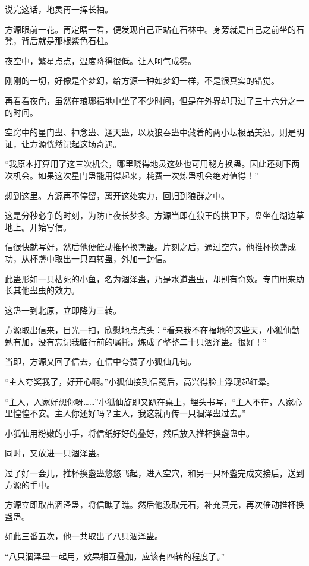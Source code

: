 \begin{this_body}
说完这话，地灵再一挥长袖。

方源眼前一花。再定睛一看，便发现自己正站在石林中。身旁就是自己之前坐的石凳，背后就是那根紫色石柱。

夜空中，繁星点点，温度降得很低。让人呵气成雾。

刚刚的一切，好像是个梦幻，给方源一种如梦幻一样，不是很真实的错觉。

再看看夜色，虽然在琅琊福地中坐了不少时间，但是在外界却只过了三十六分之一的时间。

空窍中的星门蛊、神念蛊、通天蛊，以及狼吞蛊中藏着的两小坛极品美酒。则是明证，让方源恍然记起这场奇遇。

“我原本打算用了这三次机会，哪里晓得地灵这处也可用秘方换蛊。因此还剩下两次机会。如果这次星门蛊能用得起来，耗费一次炼蛊机会绝对值得！”

想到这里。方源再不停留，离开这处实力，回归到狼群之中。

这是分秒必争的时刻，为防止夜长梦多。方源当即在狼王的拱卫下，盘坐在湖边草地上。开始写信。

信很快就写好，然后他便催动推杯换盏蛊。片刻之后，通过空穴，他推杯换盏成功，从杯盏中取出一只四转蛊，外加一封信。

此蛊形如一只枯死的小鱼，名为涸泽蛊，乃是水道蛊虫，却别有奇效。专门用来助长其他蛊虫的效力。

这蛊一到北原，立即降为三转。

方源取出信来，目光一扫，欣慰地点点头：“看来我不在福地的这些天，小狐仙勤勉有加，没有忘记我临行前的嘱托，炼成了整整二十只涸泽蛊。很好！”

当即，方源又回了信去，在信中夸赞了小狐仙几句。

“主人夸奖我了，好开心啊。”小狐仙接到信笺后，高兴得脸上浮现起红晕。

“主人，人家好想你呀……”小狐仙旋即又趴在桌上，埋头书写，“主人不在，人家心里惶惶不安。主人你还好吗？主人，我这就再传一只涸泽蛊过去。”

小狐仙用粉嫩的小手，将信纸好好的叠好，然后放入推杯换盏蛊中。

同时，又放进一只涸泽蛊。

过了好一会儿，推杯换盏蛊悠悠飞起，进入空穴，和另一只杯盏完成交接后，送到方源的手中。

方源立即取出涸泽蛊，将信瞧了瞧。然后他汲取元石，补充真元，再次催动推杯换盏蛊。

如此三番五次，他一共取出了八只涸泽蛊。

“八只涸泽蛊一起用，效果相互叠加，应该有四转的程度了。”


\end{this_body}
